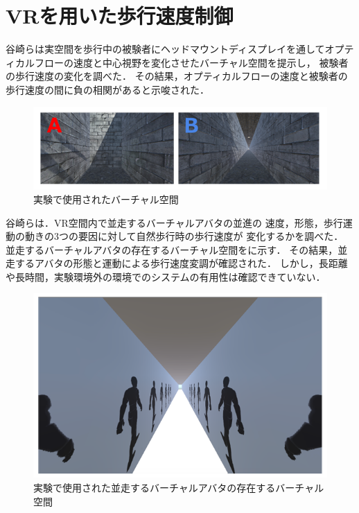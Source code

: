 \section{VRを用いた歩行速度制御}
谷崎らは実空間を歩行中の被験者にヘッドマウントディスプレイを通してオプティカルフローの速度と中心視野を変化させたバーチャル空間を提示し，
被験者の歩行速度の変化を調べた\cite{tanizaki}．
その結果，オプティカルフローの速度と被験者の歩行速度の間に負の相関があると示唆された．

\begin{figure}[H]
    \centering
    \includegraphics[clip, width=1.0\linewidth]{fig/5.PNG}
    \caption{実験で使用されたバーチャル空間}
    \label{fig:5}
\end{figure}

谷崎らは．VR空間内で並走するバーチャルアバタの並進の
速度，形態，歩行運動の動きの3つの要因に対して自然歩行時の歩行速度が
変化するかを調べた\cite{heiso}．
並走するバーチャルアバタの存在するバーチャル空間をに示す．
その結果，並走するアバタの形態と運動による歩行速度変調が確認された．
しかし，長距離や長時間，実験環境外の環境でのシステムの有用性は確認できていない．
\begin{figure}[H]
    \centering
    \includegraphics[clip, width=0.9\linewidth]{fig/15.PNG}
    \caption{実験で使用された並走するバーチャルアバタの存在するバーチャル空間}
    \label{fig:15}
\end{figure}


